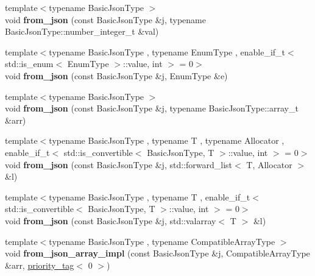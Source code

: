 \begin{DoxyCompactItemize}
\item 
{\footnotesize template$<$typename Basic\+Json\+Type $>$ }\\void {\bfseries from\+\_\+json} (const Basic\+Json\+Type \&j, typename Basic\+Json\+Type\+::number\+\_\+integer\+\_\+t \&val)\hypertarget{namespacenlohmann_1_1detail_a047d881e611fcac709dc318f730a1732}{}\label{namespacenlohmann_1_1detail_a047d881e611fcac709dc318f730a1732}

\item 
{\footnotesize template$<$typename Basic\+Json\+Type , typename Enum\+Type , enable\+\_\+if\+\_\+t$<$ std\+::is\+\_\+enum$<$ Enum\+Type $>$\+::value, int $>$  = 0$>$ }\\void {\bfseries from\+\_\+json} (const Basic\+Json\+Type \&j, Enum\+Type \&e)\hypertarget{namespacenlohmann_1_1detail_a5440d650150d01e8015133521351b459}{}\label{namespacenlohmann_1_1detail_a5440d650150d01e8015133521351b459}

\item 
{\footnotesize template$<$typename Basic\+Json\+Type $>$ }\\void {\bfseries from\+\_\+json} (const Basic\+Json\+Type \&j, typename Basic\+Json\+Type\+::array\+\_\+t \&arr)\hypertarget{namespacenlohmann_1_1detail_abc62958462b916726b89f25fa381a129}{}\label{namespacenlohmann_1_1detail_abc62958462b916726b89f25fa381a129}

\item 
{\footnotesize template$<$typename Basic\+Json\+Type , typename T , typename Allocator , enable\+\_\+if\+\_\+t$<$ std\+::is\+\_\+convertible$<$ Basic\+Json\+Type, T $>$\+::value, int $>$  = 0$>$ }\\void {\bfseries from\+\_\+json} (const Basic\+Json\+Type \&j, std\+::forward\+\_\+list$<$ T, Allocator $>$ \&l)\hypertarget{namespacenlohmann_1_1detail_a5cfb765aad92795abd7fda29d017272a}{}\label{namespacenlohmann_1_1detail_a5cfb765aad92795abd7fda29d017272a}

\item 
{\footnotesize template$<$typename Basic\+Json\+Type , typename T , enable\+\_\+if\+\_\+t$<$ std\+::is\+\_\+convertible$<$ Basic\+Json\+Type, T $>$\+::value, int $>$  = 0$>$ }\\void {\bfseries from\+\_\+json} (const Basic\+Json\+Type \&j, std\+::valarray$<$ T $>$ \&l)\hypertarget{namespacenlohmann_1_1detail_a3df497b1d3977f071b488ecac1401517}{}\label{namespacenlohmann_1_1detail_a3df497b1d3977f071b488ecac1401517}

\item 
{\footnotesize template$<$typename Basic\+Json\+Type , typename Compatible\+Array\+Type $>$ }\\void {\bfseries from\+\_\+json\+\_\+array\+\_\+impl} (const Basic\+Json\+Type \&j, Compatible\+Array\+Type \&arr, \hyperlink{structnlohmann_1_1detail_1_1priority__tag}{priority\+\_\+tag}$<$ 0 $>$)\hypertarget{namespacenlohmann_1_1detail_ac53673a5ce29fb69b96d41dad33cb3b0}{}\label{namespacenlohmann_1_1detail_ac53673a5ce29fb69b96d41dad33cb3b0}


\end{DoxyCompactItemize}
